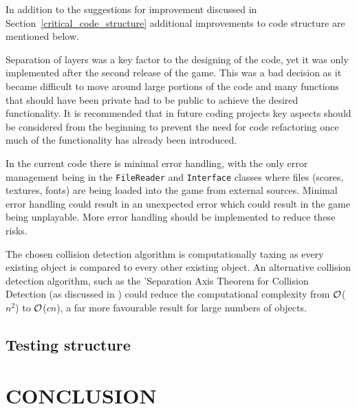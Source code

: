 \documentclass[10pt,twocolumn]{witseiepaper}
\begin{document}
In addition to the suggestions for improvement discussed in Section~\ref{critical_code_structure} additional improvements to code structure are mentioned below.

Separation of layers was a key factor to the designing of the code, yet it was only implemented after the second release of the game. This was a bad decision as it became difficult to move around large portions of the code and many functions that should have been private had to be public to achieve the desired functionality. It is recommended that in future coding projects key aspects should be considered from the beginning to prevent the need for code refactoring once much of the functionality has already been introduced.


In the current code there is minimal error handling, with the only error management being in the \texttt{FileReader} and \texttt{Interface} classes where files (scores, textures, fonts) are being loaded into the game from external sources. Minimal error handling could result in an unexpected error which could result in the game being unplayable. More error handling should be implemented to reduce these risks.

The chosen collision detection algorithm is computationally taxing as every existing object is compared to every other existing object. An alternative collision detection algorithm, such as the 'Separation Axis Theorem for Collision Detection (as discussed in \cite{Collision_detection}) could reduce the computational complexity from $\cal{O}$($n^{2}$) to $\cal{O}$($cn$), a far more favourable result for large numbers of objects.


\subsection{Testing structure}



\section{CONCLUSION}

%



\end{document}
